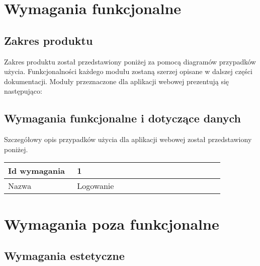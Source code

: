 \documentclass[12pt]{article}
\begin{document}
\clearpage
\section{Wymagania funkcjonalne}
\subsection{Zakres produktu}
Zakres produktu został przedstawiony poniżej za pomocą diagramów przypadków użycia. Funkcjonalności każdego modułu zostaną szerzej opisane w dalszej części dokumentacji. Moduły przeznaczone dla aplikacji webowej prezentują się następująco:





	
	
\clearpage
\subsection{Wymagania funkcjonalne i dotyczące danych}
Szczegółowy opis przypadków użycia dla aplikacji webowej został przedstawiony poniżej.
\begin{table}[H]
	\begin{tabular}{|p{0.3\linewidth}|p{0.64\linewidth}|}%
	\hline
	Id wymagania 	& 1 				\\ \hline
	Nazwa			& Logowanie \\ \hline
	\end{tabular}
\end{table}



\newpage
\section{Wymagania poza funkcjonalne}
\subsection{Wymagania estetyczne}
\end{document}
